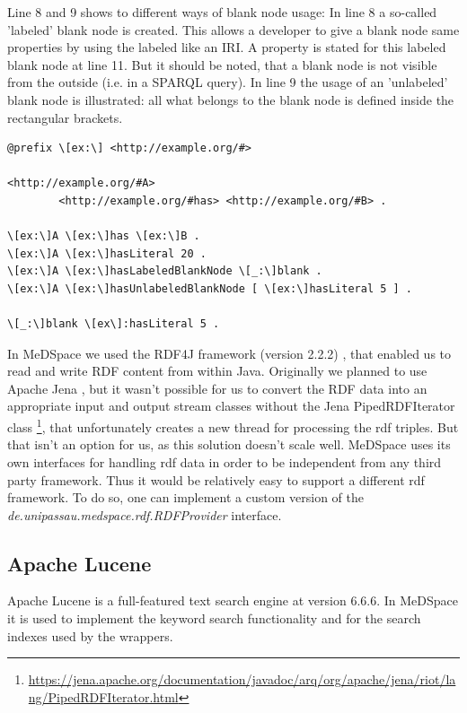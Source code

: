 Line 8 and 9 shows to different ways of blank node usage: In line 8 a so-called 'labeled' blank node is created. This allows a developer to give a blank node same properties by using the labeled like an IRI. A property is stated for this labeled blank node at line 11.
But it should be noted, that a blank node is not visible from the outside (i.e. in a SPARQL query).
In line 9 the usage of an 'unlabeled' blank node is illustrated: all what belongs to the blank node is defined inside the rectangular brackets.

\begin{lstlisting}[style=RdfCodeStyle, caption=RDF example data in Turtle syntax, label=listing1]
@prefix \[ex:\] <http://example.org/#>

<http://example.org/#A> 
		<http://example.org/#has> <http://example.org/#B> .

\[ex:\]A \[ex:\]has \[ex:\]B .
\[ex:\]A \[ex:\]hasLiteral 20 .
\[ex:\]A \[ex:\]hasLabeledBlankNode \[_:\]blank .
\[ex:\]A \[ex:\]hasUnlabeledBlankNode [ \[ex:\]hasLiteral 5 ] .

\[_:\]blank \[ex\]:hasLiteral 5 .
\end{lstlisting}


In MeDSpace we used the RDF4J framework (version 2.2.2) \cite{RDF4J}, that enabled us to read and write RDF content from within Java. Originally we planned to use Apache Jena \cite{Jena}, but it wasn't possible for us to convert the RDF data into an appropriate input and output stream classes without the Jena PipedRDFIterator class \footnote{\url{https://jena.apache.org/documentation/javadoc/arq/org/apache/jena/riot/lang/PipedRDFIterator.html}}, that unfortunately creates a new thread for processing the rdf triples. But that isn't an option for us, as this solution doesn't scale well. 
MeDSpace uses its own interfaces for handling rdf data in order to be independent from any third party framework. Thus it would be relatively easy to support a different rdf framework. To do so, one can implement a custom version of the \emph{de.unipassau.medspace.rdf.RDFProvider} interface. 

\subsection{Apache Lucene}

Apache Lucene is a full-featured text search engine \cite{LuceneCore} at version 6.6.6. In MeDSpace it is used to implement the keyword search functionality and for the search indexes used by the wrappers.

